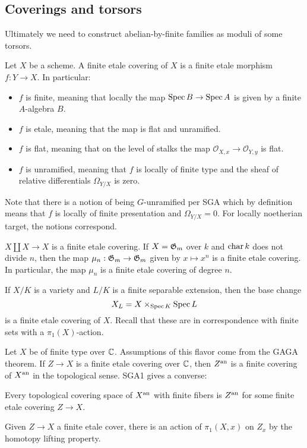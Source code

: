 \documentclass[12pt]{article}
\begin{document}
\subsection{Coverings and torsors}
Ultimately we need to construct abelian-by-finite families as moduli of some torsors.
\begin{definition}
    Let $X$ be a scheme. A finite etale covering of $X$ is a finite etale morphism $f: Y \to X$. In particular:
    \begin{itemize}
        \item $f$ is finite, meaning that locally the map $\operatorname{Spec} B \to \operatorname{Spec} A$ is given by a finite $A$-algebra $B$.
        \item $f$ is etale, meaning that the map is flat and unramified.
        \item $f$ is flat, meaning that on the level of stalks the map $\mathcal{O}_{X,x} \to \mathcal{O}_{Y,y}$ is flat.
        \item $f$ is unramified, meaning that $f$ is locally of finite type and the sheaf of relative differentials $\Omega_{Y/X}$ is zero. 
        \end{itemize}
\end{definition}
Note that there is a notion of being $G$-unramified per SGA which by definition means that $f$ is locally of finite presentation and $\Omega_{Y/X} = 0$. For locally noetherian target, the notions correspond.
\begin{example}
    $X \coprod X \to X$ is a finite etale covering. 
    If $X = \mathfrak{G}_m$ over $k$  and $\operatorname{char} k$ does not divide $n$, then the map $\mu_n: \mathfrak{G}_m \to \mathfrak{G}_m$ given by $x \mapsto x^n$ is a finite etale covering. In particular, the map $\mu_n$ is a finite etale covering of degree $n$. 

    If $X/K$ is a variety and $L/K$ is a finite separable extension, then the base change $$X_L = X \times_{\operatorname{Spec} K} \operatorname{Spec} L$$ is a finite etale covering of $X$. Recall that these are in correspondence with finite sets with a $\pi_1(X)$-action. 
\end{example}
Let $X$ be of finite type over $\mathbb{C}$. Assumptions of this flavor come from the GAGA theorem. If $Z\to X$ is a finite etale covering over $\mathbb{C}$, then $Z^{\operatorname{an}}$ is a finite covering of $X^{\operatorname{an}}$ in the topological sense. SGA1 gives a converse: 

\begin{theorem}
    Every topological covering space of $X^{\operatorname{an}}$ with finite fibers is $Z^{\operatorname{an}}$ for some finite etale covering $Z \to X$.
\end{theorem} Given $Z\to X$ a finite etale cover, there is an action of $\pi_1(X,x)$ on $Z_x$ by the homotopy lifting property.
\end{document}
